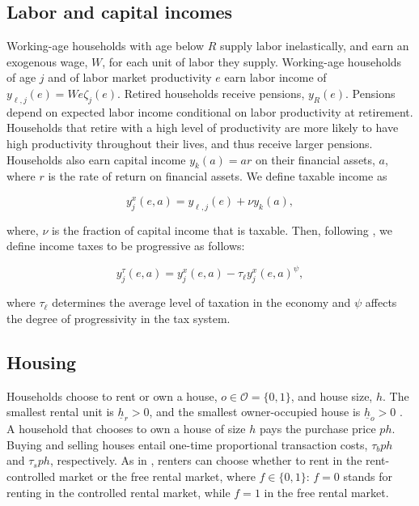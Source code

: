 \documentclass[parskip=full]{article}
\begin{document}
\subsection{Labor and capital incomes}\label{subsection:income}

Working-age households with age below $R$ supply labor inelastically, and earn an exogenous wage, $W$, for each unit of labor they supply. Working-age households of age $j$ and of labor market productivity $e$ earn labor income of $y_{\ell,j}(e)=We\zeta_j(e)$. Retired households receive pensions, $y_{R}(e)$. Pensions depend on expected labor income conditional on labor productivity at retirement. Households that retire with a high level of productivity are more likely to have high productivity throughout their lives, and thus receive larger pensions. Households also earn capital income $y_{k}(a)=ar$ on their financial assets, $a$, where $r$ is the rate of return on financial assets. We define taxable income as

\begin{equation*}\label{eq:taxable_labor_income}
  y^{x}_{j}(e,a) =y_{\ell,j}(e)+\nu y_{k}(a),
\end{equation*}

\noindent where, $\nu$ is the fraction of capital income that is taxable. Then, following \citet{hsv-2020}, we define income taxes to be progressive as follows:

\begin{equation}\label{eq:income_tax}
  y^{\tau}_{j}(e,a) = y^{x}_{j}(e,a)-\tau_{\ell}y^{x}_{j}(e,a)^{\psi},
\end{equation}

\noindent where $\tau_{\ell}$ determines the average level of taxation in the economy and $\psi$ affects the degree of progressivity in the tax system.

\subsection{Housing}\label{subsection:housing_choice}

Households choose to rent or own a house, $o \in \mathcal{O}=\{0,1\}$, and house size, $h$. The smallest rental unit is $\underline{h}_{r}>0$, and the smallest owner-occupied house is $\underline{h}_{o}>0$ \citep{gervais,sommeretal-2013,sommersullivan-2017,kaplanetal-2019}. A household that chooses to own a house of size $h$ pays the purchase price $p h$. Buying and selling houses entail one-time proportional transaction costs, $\tau_{b} p h$ and $\tau_{s} p h$, respectively. As in \citet{fallis-1985}, renters can choose whether to rent in the rent-controlled market or the free rental market, where $f \in \{0,1\}$: $f=0$ stands for renting in the controlled rental market, while $f=1$ in the free rental market. 
\end{document}
